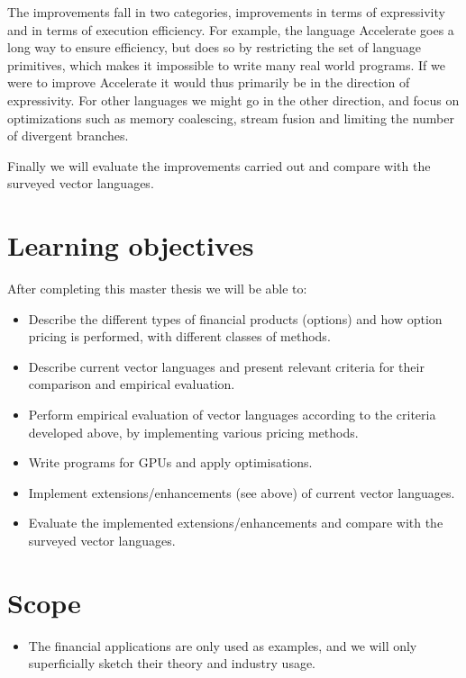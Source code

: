 \documentclass[10pt,a4paper,final,oneside,openany,article]{memoir}
\begin{document}
The improvements fall in two categories, improvements in terms of
expressivity and in terms of execution efficiency. For example, the
language Accelerate goes a long way to ensure efficiency, but does so
by restricting the set of language primitives, which makes it
impossible to write many real world programs. If we were to improve
Accelerate it would thus primarily be in the direction of
expressivity. For other languages we might go in the other direction,
and focus on optimizations such as memory coalescing, stream fusion
and limiting the number of divergent branches.

Finally we will evaluate the improvements carried out and compare with
the surveyed vector languages.

\chapter{Learning objectives}
After completing this master thesis we will be able to:
\begin{itemize}
\item Describe the different types of financial products (options) and
  how option pricing is performed, with different classes of methods.
\item Describe current vector languages and present relevant criteria
  for their comparison and empirical evaluation.
\item Perform empirical evaluation of vector languages according to
  the criteria developed above, by implementing various pricing
  methods.
\item Write programs for GPUs and apply optimisations.
\item Implement extensions/enhancements (see above) of current vector
  languages.
\item Evaluate the implemented extensions/enhancements and compare
  with the surveyed vector languages.
\end{itemize}

\chapter{Scope}
\begin{itemize}
\item The financial applications are only used as examples, and we
  will only superficially sketch their theory and industry usage.
\end{itemize}

{} 
\printbibliography

\end{document}

